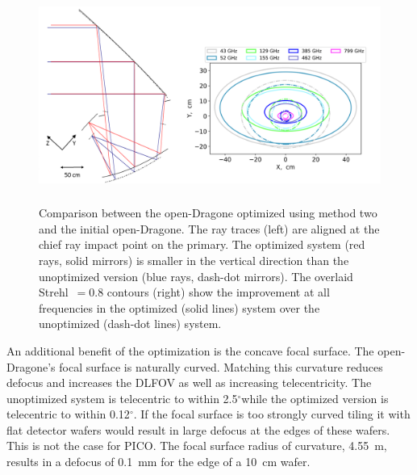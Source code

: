 \documentclass[]{spie}  %
\newcommand{\dgr}{$^\circ$}
\begin{document}
\begin{figure} [ht]
\begin{center}
\includegraphics[height=7cm]{jpl_vs_V3D.png}
\end{center}
\caption { \label{fig:compare} 
Comparison between the open-Dragone optimized using method two and the initial open-Dragone.  
The ray traces (left) are aligned at the chief ray impact point on the primary. 
The optimized system (red rays, solid mirrors) is smaller in the vertical direction than the unoptimized version 
(blue rays, dash-dot mirrors). The overlaid Strehl~$=0.8$ contours (right) show the improvement at 
all frequencies in the optimized (solid lines) system over the unoptimized (dash-dot lines) system. 
}
\end{figure} 

An additional benefit of the optimization is the concave focal surface. The open-Dragone's focal surface is naturally curved.  Matching this 
curvature reduces defocus and increases the DLFOV as well as increasing telecentricity.  The unoptimized system is telecentric to within 
2.5\dgr while the optimized version is telecentric to within 0.12\dgr. If the focal surface is too strongly curved tiling it with flat detector 
wafers would result in large defocus at the edges of these wafers.  This is not the case for PICO. The focal surface radius of curvature, 4.55~m, 
results in a defocus of 0.1~mm for the edge of a 10~cm wafer. 
\end{document}

